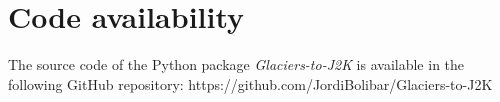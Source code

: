 \section{Code availability}

The source code of the Python package \textit{Glaciers-to-J2K} is available in the following GitHub repository: https://github.com/JordiBolibar/Glaciers-to-J2K


